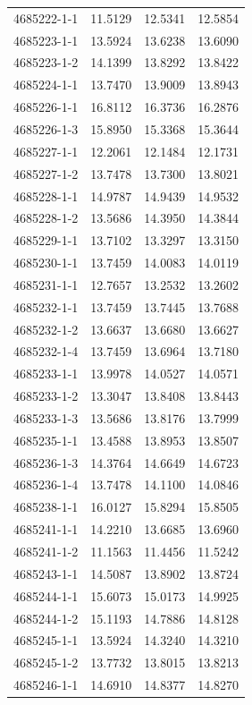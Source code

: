 \begin{longtable}{lrrr}
4685222-1-1 & 11.5129 & 12.5341 & 12.5854 \\
4685223-1-1 & 13.5924 & 13.6238 & 13.6090 \\
4685223-1-2 & 14.1399 & 13.8292 & 13.8422 \\
4685224-1-1 & 13.7470 & 13.9009 & 13.8943 \\
4685226-1-1 & 16.8112 & 16.3736 & 16.2876 \\
4685226-1-3 & 15.8950 & 15.3368 & 15.3644 \\
4685227-1-1 & 12.2061 & 12.1484 & 12.1731 \\
4685227-1-2 & 13.7478 & 13.7300 & 13.8021 \\
4685228-1-1 & 14.9787 & 14.9439 & 14.9532 \\
4685228-1-2 & 13.5686 & 14.3950 & 14.3844 \\
4685229-1-1 & 13.7102 & 13.3297 & 13.3150 \\
4685230-1-1 & 13.7459 & 14.0083 & 14.0119 \\
4685231-1-1 & 12.7657 & 13.2532 & 13.2602 \\
4685232-1-1 & 13.7459 & 13.7445 & 13.7688 \\
4685232-1-2 & 13.6637 & 13.6680 & 13.6627 \\
4685232-1-4 & 13.7459 & 13.6964 & 13.7180 \\
4685233-1-1 & 13.9978 & 14.0527 & 14.0571 \\
4685233-1-2 & 13.3047 & 13.8408 & 13.8443 \\
4685233-1-3 & 13.5686 & 13.8176 & 13.7999 \\
4685235-1-1 & 13.4588 & 13.8953 & 13.8507 \\
4685236-1-3 & 14.3764 & 14.6649 & 14.6723 \\
4685236-1-4 & 13.7478 & 14.1100 & 14.0846 \\
4685238-1-1 & 16.0127 & 15.8294 & 15.8505 \\
4685241-1-1 & 14.2210 & 13.6685 & 13.6960 \\
4685241-1-2 & 11.1563 & 11.4456 & 11.5242 \\
4685243-1-1 & 14.5087 & 13.8902 & 13.8724 \\
4685244-1-1 & 15.6073 & 15.0173 & 14.9925 \\
4685244-1-2 & 15.1193 & 14.7886 & 14.8128 \\
4685245-1-1 & 13.5924 & 14.3240 & 14.3210 \\
4685245-1-2 & 13.7732 & 13.8015 & 13.8213 \\
4685246-1-1 & 14.6910 & 14.8377 & 14.8270 \\

\end{longtable}
